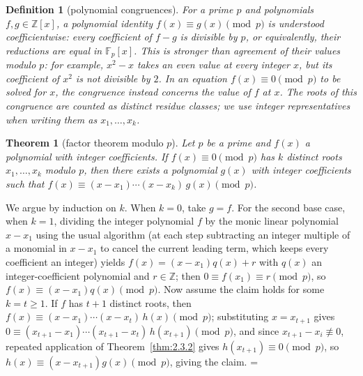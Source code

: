 \documentclass[11pt]{article}
\makeatletter
\let\nt@closedisplay\]
\def\nt@guardedclose{\@ifnextchar\par{\nt@closeafterpar}{\@ifnextchar\end{\postdisplaypenalty\@M\nt@closedisplay}{\nt@closedisplay}}}
\def\nt@closeafterpar\par{\@ifnextchar\par{\nt@closeafterpar}{\@ifnextchar\end{\postdisplaypenalty\@M\nt@closedisplay\par}{\nt@closedisplay\par}}}
\renewenvironment{proof}[1][\proofname]{\par
  \pushQED{\qed}\normalfont\topsep\medskipamount\edef\nt@afterproof{\@endparpenalty=\the\@endparpenalty\relax}\@beginparpenalty\@M\@endparpenalty\@M\let\]\nt@guardedclose\trivlist\item[]\textit{#1\@addpunct{.}} \ignorespaces}{\ifvmode\addpenalty\@M\fi\popQED\nt@afterproof\endtrivlist\@endpefalse}
\theoremstyle{ntstyle}
\newtheorem{theorem}{Theorem}[subsection]
\newtheorem{definition}{Definition}[subsection]
\makeatother
\begin{document}
\begin{definition}[polynomial congruences]\label{def:3.6.1}\label{def:polynomial-congruences}
  For a prime $p$ and polynomials $f,g\in\mathbb{Z}[x]$, a polynomial identity
  $f(x)\equiv g(x)\pmod{p}$ is understood coefficientwise: every coefficient
  of $f-g$ is divisible by $p$, or equivalently, their reductions are equal
  in $\mathbb{F}_p[x]$. This is stronger than agreement of their values
  modulo $p$: for example, $x^2-x$ takes an even value at every integer $x$, but its
  coefficient of $x^2$ is not divisible by $2$. In an equation
  $f(x)\equiv0\pmod{p}$ to be solved for $x$, the congruence instead concerns
  the value of $f$ at $x$. The roots of this congruence are counted as distinct residue classes;
  we use integer representatives when writing them as $x_1,\ldots,x_k$.

\end{definition}

\begin{theorem}[factor theorem modulo $p$]\label{thm:3.6.1}\label{thm:factor-theorem-modulo-p}
  Let $p$ be a prime and $f(x)$ a
  polynomial with integer coefficients. If $f(x) \equiv 0 \pmod{p}$ has
  $k$ distinct roots $x_1, \ldots, x_k$ modulo $p$, then there exists a
  polynomial $g(x)$ with integer coefficients such that $f(x) \equiv (x - x_1) \cdots (x - x_k)\, g(x) \pmod{p}$.

\end{theorem}

\begin{proof} We argue by induction on $k$. When $k=0$,
  take $g=f$. For the second base case, when $k=1$, dividing the integer
  polynomial $f$ by the monic linear
  polynomial $x - x_1$ using the usual algorithm (at each step subtracting an integer multiple of a monomial in
  $x - x_1$ to cancel the current leading term, which keeps every coefficient an integer) yields
  $f(x) = (x - x_1) q(x) + r$ with $q(x)$ an integer-coefficient
  polynomial and $r \in \mathbb{Z}$; then $0 \equiv f(x_1) \equiv r \pmod{p}$, so $f(x) \equiv (x - x_1) q(x) \pmod{p}$.
  Now assume the claim holds for some $k = t\ge1$. If $f$ has $t+1$
  distinct roots, then $f(x) \equiv (x - x_1) \cdots (x - x_t)\, h(x) \pmod{p}$; substituting $x = x_{t+1}$ gives
  $0 \equiv (x_{t+1} - x_1) \cdots (x_{t+1} - x_t)\, h(x_{t+1}) \pmod{p}$, and since $x_{t+1} - x_i \not\equiv 0$,
  repeated application of Theorem~\ref{thm:2.3.2} gives $h(x_{t+1}) \equiv 0 \pmod{p}$, so
  $h(x) \equiv (x - x_{t+1}) g(x) \pmod{p}$, giving the claim.
\end{proof}
\end{document}
